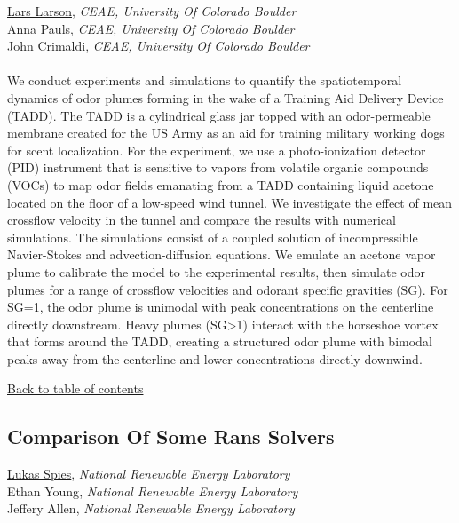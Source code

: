 \underline{Lars Larson}, \textit{CEAE, University Of Colorado Boulder}\\ 
{Anna Pauls}, \textit{CEAE, University Of Colorado Boulder}\\ 
{John Crimaldi}, \textit{CEAE, University Of Colorado Boulder}\\ 
\vspace{-0.1 in} \\ 
\noindent We conduct experiments and simulations to quantify the spatiotemporal dynamics of odor plumes forming in the wake of a Training Aid Delivery Device (TADD). The TADD is a cylindrical glass jar topped with an odor-permeable membrane created for the US Army as an aid for training military working dogs for scent localization. For the experiment, we use a photo-ionization detector (PID) instrument that is sensitive to vapors from volatile organic compounds (VOCs) to map odor fields emanating from a TADD containing liquid acetone located on the floor of a low-speed wind tunnel. We investigate the effect of mean crossflow velocity in the tunnel and compare the results with numerical simulations. The simulations consist of a coupled solution of incompressible Navier-Stokes and advection-diffusion equations. We emulate an acetone vapor plume to calibrate the model to the experimental results, then simulate odor plumes for a range of crossflow velocities and odorant specific gravities (SG). For SG=1, the odor plume is unimodal with peak concentrations on the centerline directly downstream. Heavy plumes (SG>1) interact with the horseshoe vortex that forms around the TADD, creating a structured odor plume with bimodal peaks away from the centerline and lower concentrations directly downwind. \\ 
\begin{flushright}\vspace{-0.2 in}\hyperlink{toc}{Back to table of contents}\end{flushright}\vspace{-0.2 in}
\hypertarget{LukasSpies}{\subsection*{\color{CUGOLD} Comparison Of Some Rans Solvers}} \vsp 
\underline{Lukas Spies}, \textit{National Renewable Energy Laboratory}\\ 
{Ethan Young}, \textit{National Renewable Energy Laboratory}\\ 
{Jeffery Allen}, \textit{National Renewable Energy Laboratory}\\ 
